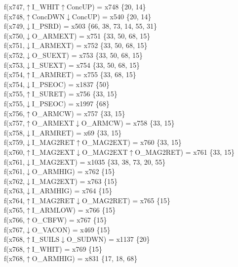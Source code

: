 f(x747,$\uparrow$I\_WHIT$\uparrow$ConcUP) = x748 \{20, 14\} \\  
f(x748,$\uparrow$ConcDWN$\downarrow$ConcUP) = x540 \{20, 14\} \\  
f(x749,$\downarrow$I\_PSRD) = x503 \{66, 38, 73, 14, 55, 31\} \\  
f(x750,$\downarrow$O\_ARMEXT) = x751 \{33, 50, 68, 15\} \\  
f(x751,$\downarrow$I\_ARMEXT) = x752 \{33, 50, 68, 15\} \\  
f(x752,$\downarrow$O\_SUEXT) = x753 \{33, 50, 68, 15\} \\  
f(x753,$\downarrow$I\_SUEXT) = x754 \{33, 50, 68, 15\} \\  
f(x754,$\uparrow$I\_ARMRET) = x755 \{33, 68, 15\} \\  
f(x754,$\downarrow$I\_PSEOC) = x1837 \{50\} \\  
f(x755,$\uparrow$I\_SURET) = x756 \{33, 15\} \\  
f(x755,$\downarrow$I\_PSEOC) = x1997 \{68\} \\  
f(x756,$\uparrow$O\_ARMCW) = x757 \{33, 15\} \\  
f(x757,$\uparrow$O\_ARMEXT$\downarrow$O\_ARMCW) = x758 \{33, 15\} \\  
f(x758,$\downarrow$I\_ARMRET) = x69 \{33, 15\} \\  
f(x759,$\downarrow$I\_MAG2RET$\uparrow$O\_MAG2EXT) = x760 \{33, 15\} \\  
f(x760,$\uparrow$I\_MAG2EXT$\downarrow$O\_MAG2EXT$\uparrow$O\_MAG2RET) = x761 \{33, 15\} \\  
f(x761,$\downarrow$I\_MAG2EXT) = x1035 \{33, 38, 73, 20, 55\} \\  
f(x761,$\downarrow$O\_ARMHIG) = x762 \{15\} \\  
f(x762,$\downarrow$I\_MAG2EXT) = x763 \{15\} \\  
f(x763,$\downarrow$I\_ARMHIG) = x764 \{15\} \\  
f(x764,$\uparrow$I\_MAG2RET$\downarrow$O\_MAG2RET) = x765 \{15\} \\  
f(x765,$\uparrow$I\_ARMLOW) = x766 \{15\} \\  
f(x766,$\uparrow$O\_CBFW) = x767 \{15\} \\  
f(x767,$\downarrow$O\_VACON) = x469 \{15\} \\  
f(x768,$\uparrow$I\_SUILS$\downarrow$O\_SUDWN) = x1137 \{20\} \\  
f(x768,$\uparrow$I\_WHIT) = x769 \{15\} \\  
f(x768,$\uparrow$O\_ARMHIG) = x831 \{17, 18, 68\} \\  
